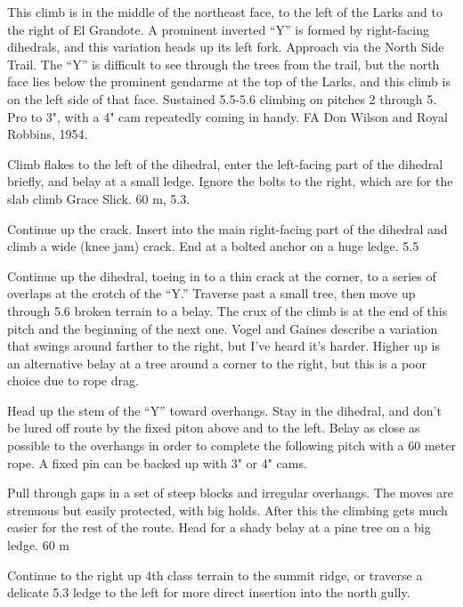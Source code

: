 \documentclass{tahquitz}
\begin{document}
This climb is in the middle of the northeast face, to the left of the
Larks and to the right of El Grandote. A prominent inverted ``Y'' is
formed by right-facing dihedrals, and this variation heads up its
left fork. Approach via the North Side Trail. The ``Y'' is difficult to
see through the trees from the trail, but the north face lies below
the prominent gendarme at the top of the Larks, and this climb is on
the left side of that face. Sustained 5.5-5.6 climbing on pitches 2
through 5. Pro to 3", with  a 4" cam repeatedly coming in handy.
FA Don Wilson and Royal Robbins, 1954.

\somespace

 Climb flakes to the left of the dihedral, enter the left-facing
part of the dihedral briefly, and belay at a small ledge. Ignore the
bolts to the right, which are for the slab climb Grace Slick. 60 m,
5.3.

 Continue up the crack. Insert into the main right-facing part of
the dihedral and climb a wide (knee jam) crack. End at a bolted
anchor on a huge ledge. 5.5

 Continue up the dihedral, toeing in to a thin crack at the
corner, to a series of overlaps at the crotch of the ``Y.'' Traverse
past a small tree, then move up through 5.6 broken terrain to a
belay. The crux of the climb is at the end of this pitch and the
beginning of the next one. Vogel and Gaines describe a variation that
swings around farther to the right, but I've heard it's harder.
Higher up is an alternative belay at a tree around a corner to the
right, but this is a poor choice due to rope drag.

 Head up the stem of the ``Y'' toward overhangs. Stay in the
dihedral, and don't be lured off route by the fixed piton above and
to the left. Belay as close as possible to the overhangs in order to
complete the following pitch with a 60 meter rope. A fixed pin can be
backed up with 3" or 4" cams.

 Pull through gaps in a set of steep blocks and irregular
overhangs. The  moves are strenuous but easily protected, with big
holds. After this the climbing gets much easier for the rest of the
route. Head for a shady belay at a pine tree on a big ledge. 60 m

 Continue to the right up 4th class terrain to the summit ridge,
or traverse a delicate 5.3 ledge to the left for more direct
insertion into the north gully.

\somespace
\end{document}
